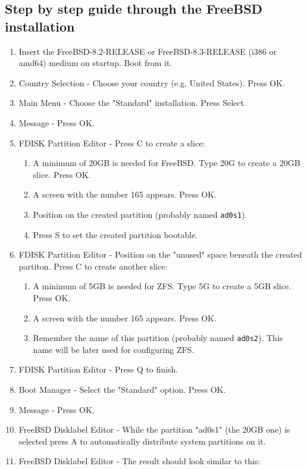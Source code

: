 \subsection{Step by step guide through the FreeBSD installation}
\begin{enumerate}
\item Insert the FreeBSD-8.2-RELEASE or FreeBSD-8.3-RELEASE (i386 or amd64) 
medium on startup. Boot from it.
\item Country Selection - Choose your country (e.g. United States). Press
OK.
\item Main Menu - Choose the "Standard" installation. Press Select.
\item Message - Press OK.
\item FDISK Partition Editor - Press C to create a slice:
    \begin{enumerate}
    \item A minimum of 20GB is needed for FreeBSD. Type 20G to create a 20GB
    slice. Press OK.
    \item A screen with the number 165 appears. Press OK.
    \item Position on the created partition (probably named \texttt{ad0s1}).
    \item Press S to set the created partition bootable.
    \end{enumerate}
\item FDISK Partition Editor - Position on the "unused" space beneath the
created partiton. Press C to create another slice:
    \begin{enumerate}
    \item A minimum of 5GB is needed for ZFS. Type 5G to create a 5GB slice. Press OK.
    \item A screen with the number 165 appears. Press OK.
    \item Remember the name of this partition (probably named \texttt{ad0s2}).
    This name will be later used for configuring ZFS.
    \end{enumerate}
\item FDISK Partition Editor - Press Q to finish.
\item Boot Manager - Select the "Standard" option. Press OK.
\item Message - Press OK.
\item FreeBSD Disklabel Editor - While the partition "ad0s1" (the 20GB one) is
selected press A to automatically distribute system partitions on it.
\item FreeBSD Disklabel Editor - The result should look similar to this:

\end{enumerate}
